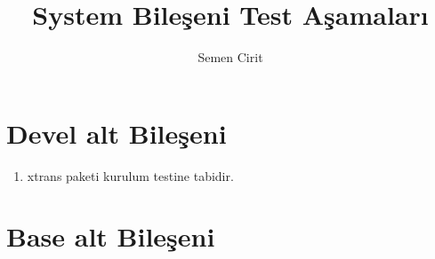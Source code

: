 \documentclass[a4paper,10pt]{article}
\title{System Bileşeni Test Aşamaları}
\author{Semen Cirit}
\begin{document}
\maketitle


\section{Devel alt Bileşeni}
\begin{enumerate}
 \item xtrans paketi kurulum testine tabidir.
\end{enumerate}


\section{Base alt Bileşeni}
\end{document}
